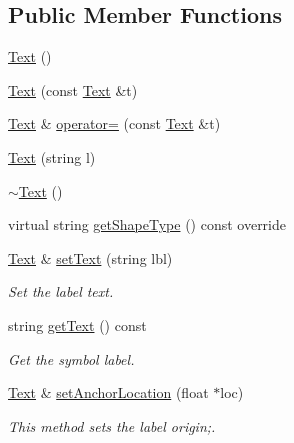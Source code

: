 \subsection*{Public Member Functions}
\begin{DoxyCompactItemize}
\item 
\hyperlink{classbridges_1_1datastructure_1_1_text_aa6ba3a8ed63b848bfab02c6c444a3559}{Text} ()
\item 
\hyperlink{classbridges_1_1datastructure_1_1_text_afcfc2b00059263b7e44ff60c25a64b56}{Text} (const \hyperlink{classbridges_1_1datastructure_1_1_text}{Text} \&t)
\item 
\hyperlink{classbridges_1_1datastructure_1_1_text}{Text} \& \hyperlink{classbridges_1_1datastructure_1_1_text_ad61a09265cc7c7b44b3d39c0140927ea}{operator=} (const \hyperlink{classbridges_1_1datastructure_1_1_text}{Text} \&t)
\item 
\hyperlink{classbridges_1_1datastructure_1_1_text_a9c5ff8c25a39680605e4efb8d66d0a9a}{Text} (string l)
\item 
\hyperlink{classbridges_1_1datastructure_1_1_text_a041e6ab367876ba1d6306438d2ff4bf1}{$\sim$\+Text} ()
\item 
virtual string \hyperlink{classbridges_1_1datastructure_1_1_text_a039d614f2f74fe4dbb74e7b3410f53d9}{get\+Shape\+Type} () const override
\item 
\hyperlink{classbridges_1_1datastructure_1_1_text}{Text} \& \hyperlink{classbridges_1_1datastructure_1_1_text_a436eec269f97fc54a1ca4fd8c4f68545}{set\+Text} (string lbl)
\begin{DoxyCompactList}\small\item\em Set the label text. \end{DoxyCompactList}\item 
string \hyperlink{classbridges_1_1datastructure_1_1_text_a0485be6f3213dd8ab8cbe0266dda3afe}{get\+Text} () const
\begin{DoxyCompactList}\small\item\em Get the symbol label. \end{DoxyCompactList}\item 
\hyperlink{classbridges_1_1datastructure_1_1_text}{Text} \& \hyperlink{classbridges_1_1datastructure_1_1_text_afc919b73ccbc5b331da644b9ce940806}{set\+Anchor\+Location} (float $\ast$loc)
\begin{DoxyCompactList}\small\item\em This method sets the label origin;. \end{DoxyCompactList}\item 

\end{DoxyCompactItemize}
